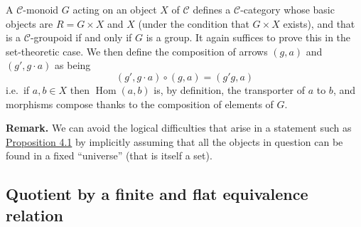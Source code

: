 \documentclass{article}
\newenvironment{rmenv}[1]
  {\phantomsection\par\smallskip\noindent\textbf{#1.}\rmfamily}
  {\par\smallskip}
\theoremstyle{definition}
\theoremstyle{definition}
\theoremstyle{definition}
\theoremstyle{definition}
\theoremstyle{remark}
\begin{document}
A \({\mathcal{C}}\)-monoid \(G\) acting on an object \(X\) of \({\mathcal{C}}\) defines a \({\mathcal{C}}\)-category whose basic objects are \(R=G\times X\) and \(X\) (under the condition that \(G\times X\) exists), and that is a \({\mathcal{C}}\)-groupoid if and only if \(G\) is a group.
It again suffices to prove this in the set-theoretic case.
We then define the composition of arrows \((g,a)\) and \((g',g\cdot a)\) as being
\[
  (g',g\cdot a) \circ (g,a) = (g'g,a)
\]
i.e.~if \(a,b\in X\) then \(\operatorname{Hom}(a,b)\) is, by definition, the transporter of \(a\) to \(b\), and morphisms compose thanks to the composition of elements of \(G\).

\begin{rmenv}{Remark}
We can avoid the logical difficulties that arise in a statement such as \protect\hyperlink{fga-3-iii-proposition-4.1}{Proposition 4.1} by implicitly assuming that all the objects in question can be found in a fixed ``universe'' (that is itself a set).

\end{rmenv}

\hypertarget{fga-3-iii-section-5}{%
\subsection{Quotient by a finite and flat equivalence relation}\label{fga-3-iii-section-5}}
\end{document}
